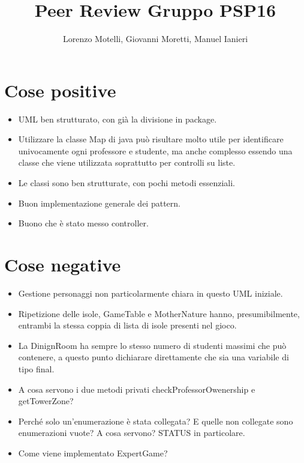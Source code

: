 \documentclass[12pt]{report}
\begin{document}
	\author{Lorenzo Motelli, Giovanni Moretti, Manuel Ianieri}
	\title{\textbf{Peer Review Gruppo PSP16}}
	\maketitle
	
	\section*{Cose positive}
		\begin{itemize}
			\item UML ben strutturato, con già la divisione in package.
			\item Utilizzare la classe Map di java può risultare molto utile per identificare univocamente ogni professore e studente, ma anche complesso essendo una classe che viene utilizzata soprattutto per controlli su liste.
			\item Le classi sono ben strutturate, con pochi metodi essenziali.
			\item Buon implementazione generale dei pattern.
			\item Buono che è stato messo controller.
		\end{itemize}
	\section*{Cose negative}
		\begin{itemize}
			\item Gestione personaggi non particolarmente chiara in questo UML iniziale.
			\item Ripetizione delle isole, GameTable e MotherNature hanno, presumibilmente, entrambi la stessa coppia di lista di isole presenti nel gioco.
			\item La DinignRoom ha sempre lo stesso numero di studenti massimi che può contenere, a questo punto dichiarare direttamente che sia una variabile di tipo final.
			\item A cosa servono i due metodi privati checkProfessorOwenership e getTowerZone?
			\item Perché solo un'enumerazione è stata collegata? E quelle non collegate sono enumerazioni vuote? A cosa servono? STATUS in particolare.
			\item Come viene implementato ExpertGame?
		\end{itemize}
	\newpage
\end{document}
